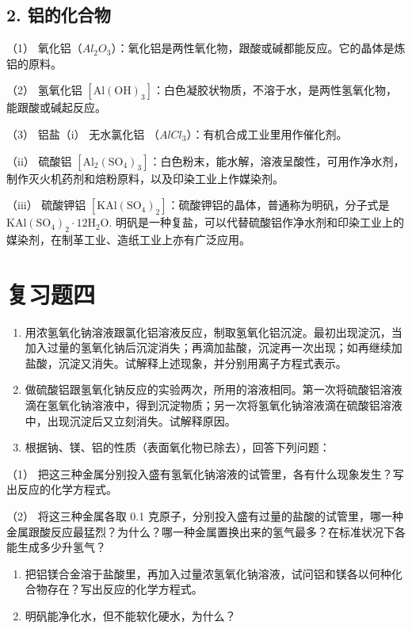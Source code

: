 \subsection{2. 铝的化合物}

（1）
氧化铝（\(Al_{2}O_{3}\)）：氧化铝是两性氧化物，跟酸或碱都能反应。它的晶体是炼铝的原料。

（2） 氢氧化铝
\(\left[\mathrm{Al}(\mathrm{OH})_{3}\right]\)：白色凝胶状物质，不溶于水，是两性氢氧化物，能跟酸或碱起反应。

（3） 铝盐（i） 无水氯化铝 （\(AlCl_{3}\)）：有机合成工业里用作催化剂。

（ii） 硫酸铝
\(\left[\mathrm{Al}_{2}\left(\mathrm{SO}_{4}\right)_{3}\right]\)：白色粉末，能水解，溶液呈酸性，可用作净水剂，制作灭火机药剂和焙粉原料，以及印染工业上作媒染剂。

（iii） 硫酸钾铝
\(\left[\mathrm{KAl}\left(\mathrm{SO}_{4}\right)_{2}\right]\)：硫酸钾铝的晶体，普通称为明矾，分子式是
\(\mathrm{KAl}\left(\mathrm{SO}_{4}\right)_{2} \cdot 12 \mathrm{H}_{2} \mathrm{O}\).
明矾是一种复盐，可以代替硫酸铝作净水剂和印染工业上的媒染剂，在制革工业、造纸工业上亦有广泛应用。

\section{复习题四}

\begin{enumerate}
\item
  用浓氢氧化钠溶液跟氯化铝溶液反应，制取氢氧化铝沉淀。最初出现淀沉，当加入过量的氢氧化钠后沉淀消失；再滴加盐酸，沉淀再一次出现；如再继续加盐酸，沉淀又消失。试解释上述现象，并分别用离子方程式表示。
\item
  做硫酸铝跟氢氧化钠反应的实验两次，所用的溶液相同。第一次将硫酸铝溶液滴在氢氧化钠溶液中，得到沉淀物质；另一次将氢氧化钠溶液滴在硫酸铝溶液中，出现沉淀后又立刻消失。试解释原因。
\item
  根据钠、镁、铝的性质（表面氧化物已除去），回答下列问题：
\end{enumerate}

（1）
把这三种金属分别投入盛有氢氧化钠溶液的试管里，各有什么现象发生？写出反应的化学方程式。

（2） 将这三种金属各取 0.1
克原子，分别投入盛有过量的盐酸的试管里，哪一种金属跟酸反应最猛烈？为什么？哪一种金属置换出来的氢气最多？在标准状况下各能生成多少升氢气？

\begin{enumerate}[start=4]
\item
  把铝镁合金溶于盐酸里，再加入过量浓氢氧化钠溶液，试问铝和镁各以何种化合物存在？写出反应的化学方程式。
\item
  明矾能净化水，但不能软化硬水，为什么？
\end{enumerate}

